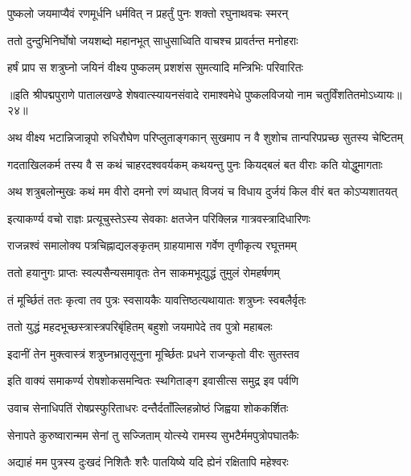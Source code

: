 \twolineshloka
{पुष्कलो जयमाप्यैवं रणमूर्धनि धर्मवित्}
{न प्रहर्तुं पुनः शक्तो रघुनाथवचः स्मरन्}%

\twolineshloka
{ततो दुन्दुभिनिर्घोषो जयशब्दो महानभूत्}
{साधुसाध्विति वाचश्च प्रावर्तन्त मनोहराः}%

\twolineshloka
{हर्षं प्राप स शत्रुघ्नो जयिनं वीक्ष्य पुष्कलम्}
{प्रशशंस सुमत्यादि मन्त्रिभिः परिवारितः}%

{॥इति श्रीपद्मपुराणे पातालखण्डे शेषवात्स्यायनसंवादे रामाश्वमेधे पुष्कलविजयो नाम चतुर्विंशतितमोऽध्यायः॥२४॥}

\resetShloka


\twolineshloka
{अथ वीक्ष्य भटान्निजान्नृपो रुधिरौघेण परिप्लुताङ्गकान्}
{सुखमाप न वै शुशोच तान्परिपप्रच्छ सुतस्य चेष्टितम्}%

\twolineshloka
{गदताखिलकर्म तस्य वै स कथं चाहरदश्ववर्यकम्}
{कथयन्तु पुनः कियद्बलं बत वीराः कति योद्धुमागताः}%

\twolineshloka
{अथ शत्रुबलोन्मुखः कथं मम वीरो दमनो रणं व्यधात्}
{विजयं च विधाय दुर्जयं किल वीरं बत कोऽप्यशातयत्}%

\twolineshloka
{इत्याकर्ण्य वचो राज्ञः प्रत्यूचुस्तेऽस्य सेवकाः}
{क्षतजेन परिक्लिन्न गात्रवस्त्रादिधारिणः}%

\twolineshloka
{राजन्नश्वं समालोक्य पत्रचिह्नाद्यलङ्कृतम्}
{ग्राहयामास गर्वेण तृणीकृत्य रघूत्तमम्}%

\twolineshloka
{ततो हयानुगः प्राप्तः स्वल्पसैन्यसमावृतः}
{तेन साकमभूद्युद्धं तुमुलं रोमहर्षणम्}%

\twolineshloka
{तं मूर्च्छितं ततः कृत्वा तव पुत्रः स्वसायकैः}
{यावत्तिष्ठत्यथायातः शत्रुघ्नः स्वबलैर्वृतः}%

\twolineshloka
{ततो युद्धं महदभूच्छस्त्रास्त्रपरिबृंहितम्}
{बहुशो जयमापेदे तव पुत्रो महाबलः}%

\twolineshloka
{इदानीं तेन मुक्त्वास्त्रं शत्रुघ्नभ्रातृसूनुना}
{मूर्च्छितः प्रधने राजन्कृतो वीरः सुतस्तव}%

\twolineshloka
{इति वाक्यं समाकर्ण्य रोषशोकसमन्वितः}
{स्थगिताङ्ग इवासीत्स समुद्र इव पर्वणि}%

\twolineshloka
{उवाच सेनाधिपतिं रोषप्रस्फुरिताधरः}
{दन्तैर्दताँल्लिहन्नोष्ठं जिह्वया शोककर्शितः}%

\twolineshloka
{सेनापते कुरुष्वारान्मम सेनां तु सज्जिताम्}
{योत्स्ये रामस्य सुभटैर्ममपुत्रोपघातकैः}%

\twolineshloka
{अद्याहं मम पुत्रस्य दुःखदं निशितैः शरैः}
{पातयिष्ये यदि ह्येनं रक्षितापि महेश्वरः}%

